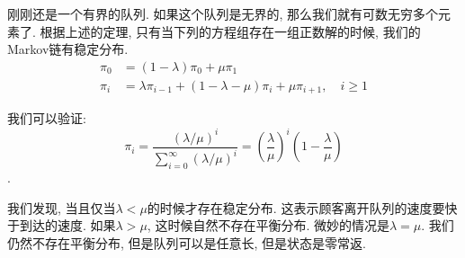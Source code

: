 \begin{example}
    刚刚还是一个有界的队列. 如果这个队列是无界的, 那么我们就有可数无穷多个元素了. 根据上述的定理, 只有当下列的方程组存在一组正数解的时候, 我们的Markov链有稳定分布. 
    $$\begin{aligned} \pi_0 & =(1-\lambda) \pi_0+\mu \pi_1 \\ \pi_i & =\lambda \pi_{i-1}+(1-\lambda-\mu) \pi_i+\mu \pi_{i+1}, \quad i \geq 1\end{aligned}$$

    我们可以验证: $$\pi_i=\frac{(\lambda / \mu)^i}{\sum_{i=0}^{\infty}(\lambda / \mu)^i}=\left(\frac{\lambda}{\mu}\right)^i\left(1-\frac{\lambda}{\mu}\right)$$.

    我们发现, 当且仅当$\lambda < \mu$的时候才存在稳定分布. 这表示顾客离开队列的速度要快于到达的速度. 如果$\lambda > \mu$, 这时候自然不存在平衡分布. 微妙的情况是$\lambda = \mu$. 我们仍然不存在平衡分布, 但是队列可以是任意长, 但是状态是零常返. 

\end{example}